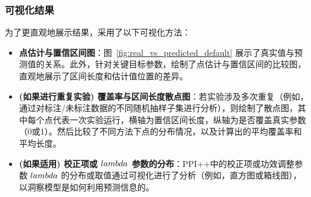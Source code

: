 \documentclass[12pt,a4paper]{article}
\begin{document}
\subsubsection{可视化结果}
\label{sec:viz_results_text}
为了更直观地展示结果，采用了以下可视化方法：
\begin{itemize}
    \item \textbf{点估计与置信区间图}：图~\ref{fig:real_vs_predicted_default} 展示了真实值与预测值的关系。此外，针对关键目标参数，绘制了点估计与置信区间的比较图，直观地展示了区间长度和估计值位置的差异。
    \item \textbf{(如果进行重复实验) 覆盖率与区间长度散点图}：若实验涉及多次重复（例如，通过对标注/未标注数据的不同随机抽样子集进行分析），则绘制了散点图，其中每个点代表一次实验运行，横轴为置信区间长度，纵轴为是否覆盖真实参数（0或1）。然后比较了不同方法下点的分布情况，以及计算出的平均覆盖率和平均长度。
    \item \textbf{(如果适用) 校正项或 $\\lambda$ 参数的分布}：PPI++中的校正项或功效调整参数 $\\lambda$ 的分布或取值通过可视化进行了分析（例如，直方图或箱线图），以洞察模型是如何利用预测信息的。
\end{itemize}
\end{document}

